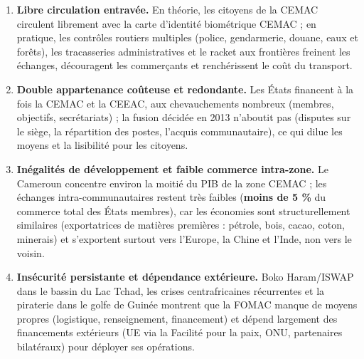 \documentclass[11pt]{article}
\newcommand{\cle}[1]{{\popxbold\color{popdark}#1}}
\begin{document}
\begin{enumerate}
\item \textbf{Libre circulation entravée.} En théorie, les citoyens de la CEMAC circulent librement avec la carte d'identité biométrique CEMAC ; en pratique, les \cle{contrôles routiers} multiples (police, gendarmerie, douane, eaux et forêts), les tracasseries administratives et le racket aux frontières freinent les échanges, découragent les commerçants et renchérissent le coût du transport.
\item \textbf{Double appartenance coûteuse et redondante.} Les États financent à la fois la CEMAC et la CEEAC, aux chevauchements nombreux (membres, objectifs, secrétariats) ; la fusion décidée en 2013 n'aboutit pas (disputes sur le siège, la répartition des postes, l'acquis communautaire), ce qui dilue les moyens et la lisibilité pour les citoyens.
\item \textbf{Inégalités de développement et faible commerce intra-zone.} Le Cameroun concentre environ la moitié du PIB de la zone CEMAC ; les échanges intra-communautaires restent très faibles (\textbf{moins de 5 \%} du commerce total des États membres), car les économies sont structurellement similaires (exportatrices de matières premières : pétrole, bois, cacao, coton, minerais) et s'exportent surtout vers l'Europe, la Chine et l'Inde, non vers le voisin.
\item \textbf{Insécurité persistante et dépendance extérieure.} Boko Haram/ISWAP dans le bassin du Lac Tchad, les crises centrafricaines récurrentes et la piraterie dans le golfe de Guinée montrent que la FOMAC manque de moyens propres (logistique, renseignement, financement) et dépend largement des financements extérieurs (UE via la Facilité pour la paix, ONU, partenaires bilatéraux) pour déployer ses opérations.
\end{enumerate}
\end{document}
